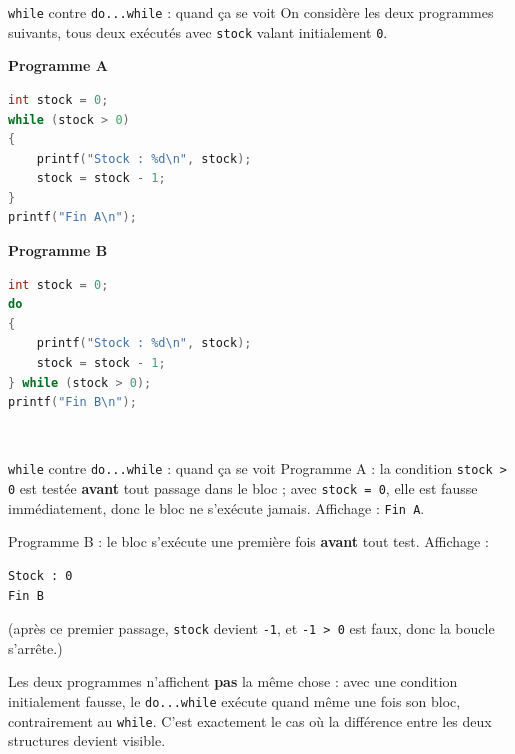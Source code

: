 \begin{UPSTIexercice}{\texttt{while} contre \texttt{do...while} : quand ça se voit}
    On considère les deux programmes suivants, tous deux exécutés avec \texttt{stock} valant initialement \texttt{0}.
    \noindent\\
    \begin{minipage}[t]{0.48\linewidth}
        \textbf{Programme A}
        \begin{lstlisting}[language=C]
int stock = 0;
while (stock > 0)
{
    printf("Stock : %d\n", stock);
    stock = stock - 1;
}
printf("Fin A\n");
        \end{lstlisting}
    \end{minipage}\hfill
    \begin{minipage}[t]{0.48\linewidth}
        \textbf{Programme B}
        \begin{lstlisting}[language=C]
int stock = 0;
do
{
    printf("Stock : %d\n", stock);
    stock = stock - 1;
} while (stock > 0);
printf("Fin B\n");
        \end{lstlisting}
    \end{minipage}\\
\end{UPSTIexercice}

\begin{UPSTIprofOnlyEnv}
    \begin{UPSTIcorrectionP}{\texttt{while} contre \texttt{do...while} : quand ça se voit}
        Programme A : la condition \texttt{stock > 0} est testée \textbf{avant} tout passage dans le bloc ; avec \texttt{stock = 0}, elle est fausse immédiatement, donc le bloc ne s'exécute jamais. Affichage : \texttt{Fin A}.

        Programme B : le bloc s'exécute une première fois \textbf{avant} tout test. Affichage :
        \begin{lstlisting}[language=bash,style=console]
Stock : 0
Fin B
        \end{lstlisting}
        (après ce premier passage, \texttt{stock} devient \texttt{-1}, et \texttt{-1 > 0} est faux, donc la boucle s'arrête.)

        Les deux programmes n'affichent \textbf{pas} la même chose : avec une condition initialement fausse, le \texttt{do...while} exécute quand même une fois son bloc, contrairement au \texttt{while}. C'est exactement le cas où la différence entre les deux structures devient visible.
    \end{UPSTIcorrectionP}
\end{UPSTIprofOnlyEnv}
